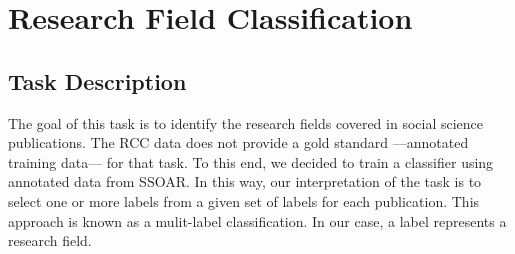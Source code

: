 
\section{Research Field Classification}
\label{section:field_classification}
\subsection{Task Description}
The goal of this task is to identify the research fields covered in social science publications.
The RCC data does not provide a gold standard ---annotated training data--- for that task. To this end, we decided to train a classifier using annotated data from SSOAR.
In this way, our interpretation of the task is to select one or more labels from a given set of labels for each publication. This approach is known as a mulit-label classification. In our case, a label represents a research field.
